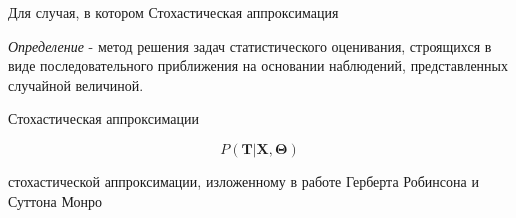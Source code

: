 Для случая, в котором 
Стохастическая аппроксимация 


\textit{Определение}  - метод решения задач статистического оценивания,
 строящихся в виде последовательного приближения на основании наблюдений, представленных случайной величиной.

Стохастическая аппроксимации

$$
    P(\mathbf{T}| \mathbf{X},\mathbf{\Theta})
$$

стохастической аппроксимации,
 изложенному в работе Герберта Робинсона и Суттона Монро \cite{robbins1951stochastic}

